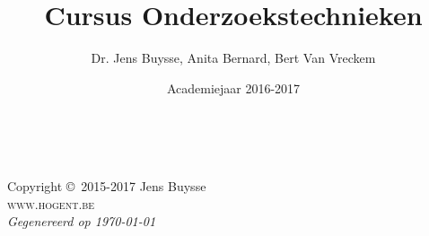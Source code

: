 \documentclass[11pt,fleqn,a4paper]{book}
\author{Dr. Jens Buysse, Anita Bernard, Bert Van Vreckem}
\title{Cursus Onderzoekstechnieken}
\date{Academiejaar 2016-2017}
\begin{document}
\thetitlepage


\newpage
~\vfill
\thispagestyle{empty}

\noindent Copyright \copyright\ 2015-2017 Jens Buysse\\ %

\noindent \textsc{www.hogent.be}\\ %

\noindent \textit{Gegenereerd op \today} %


\usechapterimagefalse

\tableofcontents %

\cleardoublepage %

\setlength{\parindent}{0pt}

\def\R{\mathbb{R}}










\begin{appendices}








\clearpage
{}
\printbibliography

\clearpage
{}
\printindex
\end{appendices}
\end{document}
